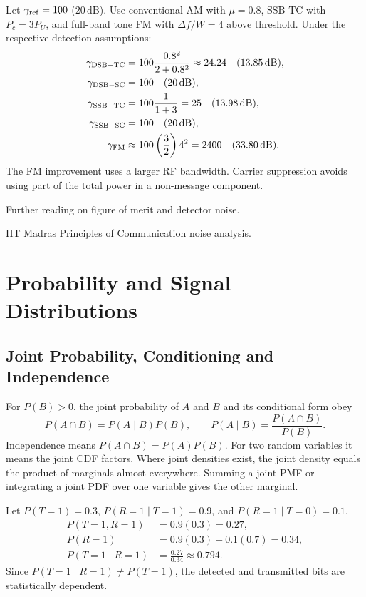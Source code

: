 \documentclass[12pt,a4paper]{article}
\begin{document}
\begin{tcolorbox}[examplebox, title={Compare Five Schemes at Equal Total Received Power}]
Let $\gamma_{\rm ref}=100$ ($20\,\mathrm{dB}$). Use conventional AM with $\mu=0.8$, SSB-TC with $P_c=3P_U$, and full-band tone FM with $\Delta f/W=4$ above threshold. Under the respective detection assumptions:
\[
\begin{aligned}
 \gamma_{\rm DSB-TC}&=100\frac{0.8^2}{2+0.8^2}
          \approx24.24\quad(13.85\,\mathrm{dB}),\\
 \gamma_{\rm DSB-SC}&=100\quad(20\,\mathrm{dB}),\\
 \gamma_{\rm SSB-TC}&=100\frac{1}{1+3}
          =25\quad(13.98\,\mathrm{dB}),\\
 \gamma_{\rm SSB-SC}&=100\quad(20\,\mathrm{dB}),\\
 \gamma_{\rm FM}&\approx100\left(\frac32\right)4^2
          =2400\quad(33.80\,\mathrm{dB}).
\end{aligned}
\]
The FM improvement uses a larger RF bandwidth. Carrier suppression avoids using part of the total power in a non-message component.
\end{tcolorbox}
\par\smallskip
{\small Further reading on figure of merit and detector noise.

\href{https://archive.nptel.ac.in/content/storage2/courses/117106090/Pdfs/1_10.pdf}{IIT Madras Principles of Communication noise analysis}.\par}

\section{Probability and Signal Distributions}
\subsection{Joint Probability, Conditioning and Independence}
For $P(B)>0$, the joint probability of $A$ and $B$ and its conditional form obey
\[
 P(A\cap B)=P(A\mid B)P(B),\qquad
 P(A\mid B)=\frac{P(A\cap B)}{P(B)}.
\]
Independence means $P(A\cap B)=P(A)P(B)$. For two random variables it means the joint CDF factors. Where joint densities exist, the joint density equals the product of marginals almost everywhere. Summing a joint PMF or integrating a joint PDF over one variable gives the other marginal.

\begin{tcolorbox}[examplebox, title={Infer a Transmitted Bit from the Detected Bit}]
Let $P(T=1)=0.3$, $P(R=1\mid T=1)=0.9$, and $P(R=1\mid T=0)=0.1$.
\[
\begin{aligned}
 P(T=1,R=1)&=0.9(0.3)=0.27,\\
 P(R=1)&=0.9(0.3)+0.1(0.7)=0.34,\\
 P(T=1\mid R=1)&=\frac{0.27}{0.34}\approx0.794.
\end{aligned}
\]
Since $P(T=1\mid R=1)\ne P(T=1)$, the detected and transmitted bits are statistically dependent.
\end{tcolorbox}
\end{document}
